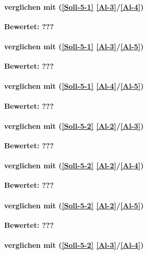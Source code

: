 \paragraph*{  verglichen mit  (\ref{Soll-5-1} \ref{Al-3}/\ref{Al-4})}

\textbf{Bewertet: ???}

\paragraph*{  verglichen mit  (\ref{Soll-5-1} \ref{Al-3}/\ref{Al-5})}

\textbf{Bewertet: ???}


\paragraph*{  verglichen mit  (\ref{Soll-5-1} \ref{Al-4}/\ref{Al-5})}

\textbf{Bewertet: ???}


\paragraph*{  verglichen mit  (\ref{Soll-5-2} \ref{Al-2}/\ref{Al-3})}

\textbf{Bewertet: ???}

\paragraph*{  verglichen mit  (\ref{Soll-5-2} \ref{Al-2}/\ref{Al-4})}

\textbf{Bewertet: ???}

\paragraph*{  verglichen mit  (\ref{Soll-5-2} \ref{Al-2}/\ref{Al-5})}

\textbf{Bewertet: ???}

\paragraph*{  verglichen mit  (\ref{Soll-5-2} \ref{Al-3}/\ref{Al-4})}

